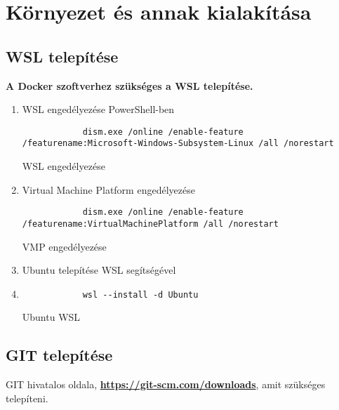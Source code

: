 ﻿\chapter{Környezet és annak kialakítása}

\section{WSL telepítése}
\begin{flushleft}
    \textbf{A Docker szoftverhez szükséges a WSL telepítése.}
\end{flushleft}
\begin{enumerate}
    \item WSL engedélyezése PowerShell-ben
    \begin{listing}[H]
        \begin{verbatim}
            dism.exe /online /enable-feature /featurename:Microsoft-Windows-Subsystem-Linux /all /norestart
        \end{verbatim}
        \caption{WSL engedélyezése}
        \label{code:wsl_ena}
    \end{listing}
    \item Virtual Machine Platform engedélyezése
    \begin{listing}[H]
        \begin{verbatim}
            dism.exe /online /enable-feature /featurename:VirtualMachinePlatform /all /norestart
        \end{verbatim}
        \caption{VMP engedélyezése}
        \label{code:vmp}
    \end{listing}
    \item Ubuntu telepítése WSL segítségével
    \item \begin{listing}[H]
        \begin{verbatim}
            wsl --install -d Ubuntu
        \end{verbatim}
        \caption{Ubuntu WSL}
        \label{code:ubuntu_wsl}
    \end{listing}
\end{enumerate}

\section{GIT telepítése}
\begin{flushleft}
    GIT hivatalos oldala, \textbf{\href{https://git-scm.com/downloads}{https://git-scm.com/downloads}}, amit szükséges telepíteni.
\end{flushleft}

